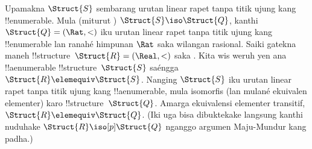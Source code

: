 \documentclass[../../../include/open-logic-section]{subfiles}
\begin{document}
\begin{rem}
  Upamakna $\Struct{S}$ sembarang
  urutan linear rapet
  tanpa titik ujung kang
  !!{enumerable}.
  Mula (miturut
  )
  $\Struct{S} \iso
  \Struct{Q}$, kanthi
  $\Struct{Q} = (\Rat, <)$
  iku urutan linear rapet
  tanpa titik ujung kang
  !!{enumerable} lan
  ranahé himpunan $\Rat$
  saka wilangan rasional.
  Saiki gatekna maneh
  !!{structure}~$\Struct{R} =
  (\Real, <)$ saka
  .
  Kita wis weruh yen ana
  !!a{enumerable}
  !!{structure}~$\Struct{S}$
  saéngga $\Struct{R}
  \elemequiv \Struct{S}$.
  Nanging $\Struct{S}$
  iku urutan linear rapet
  tanpa titik ujung kang
  !!a{enumerable}, mula
  isomorfis (lan mulané
  ekuivalen elementer)
  karo !!{structure}~$\Struct{Q}$.
  Amarga ekuivalensi elementer
  transitif, $\Struct{R}
  \elemequiv \Struct{Q}$.
  (Iki uga bisa dibuktekake
  langsung kanthi nuduhake
  $\Struct{R} \iso[p]
  \Struct{Q}$ nganggo
  argumen Maju-Mundur
  kang padha.)
\end{rem}
\end{document}
